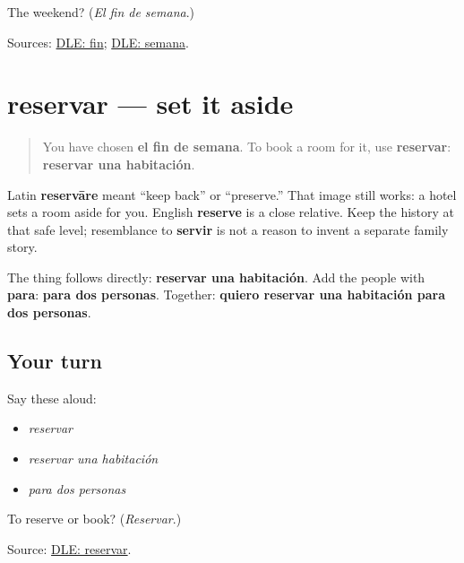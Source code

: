 \begin{tcolorbox}[breakable,colback=teal!4,colframe=teal!35!black,title={Before you move on}]
The weekend? (\emph{El fin de semana}.)

Sources: \href{https://dle.rae.es/fin}{DLE: fin}; \href{https://dle.rae.es/semana}{DLE: semana}.
\end{tcolorbox}
\section[reservar]{reservar — set it aside}

\label{lesson:ES-C409-reservar}



\begin{quote}
You have chosen \textbf{el fin de semana}. To book a room for it, use \textbf{reservar}: \textbf{reservar una habitación}.
\end{quote}

\begin{cousinweb}
Latin \textbf{reservāre} meant “keep back” or “preserve.” That image still works: a hotel sets a room aside for you. English \textbf{reserve} is a close relative. Keep the history at that safe level; resemblance to \textbf{servir} is not a reason to invent a separate family story.
\end{cousinweb}

\begin{grammarlens}[title={Grammar Lens: book a thing for people}]
The thing follows directly: \textbf{reservar una habitación}. Add the people with \textbf{para}: \textbf{para dos personas}. Together: \textbf{quiero reservar una habitación para dos personas}.
\end{grammarlens}

\subsection*{Your turn}
Say these aloud:

\begin{itemize}
\raggedright
  \item \emph{reservar}
  \item \emph{reservar una habitación}
  \item \emph{para dos personas}
\end{itemize}

\begin{tcolorbox}[breakable,colback=teal!4,colframe=teal!35!black,title={Before you move on}]
To reserve or book? (\emph{Reservar}.)

Source: \href{https://dle.rae.es/reservar}{DLE: reservar}.
\end{tcolorbox}
